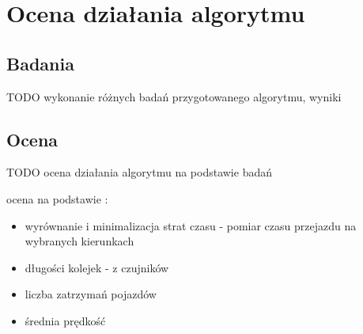 \chapter{Ocena działania algorytmu}
\section{Badania}
TODO wykonanie różnych badań przygotowanego algorytmu, wyniki

\section{Ocena}
\label{chap:ocena}
TODO ocena działania algorytmu na podstawie badań

ocena na podstawie \cite{kawalec+sobieszuk-durka}:
\begin{itemize}
\item wyrównanie i minimalizacja strat czasu - pomiar czasu przejazdu na wybranych kierunkach
\item długości kolejek - z czujników
\item liczba zatrzymań pojazdów
\item średnia prędkość
\end{itemize}